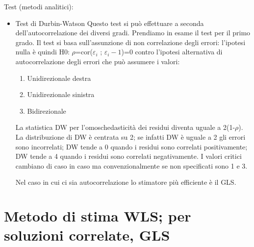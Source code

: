 \documentclass[a4page, 11pt]{article}
\begin{document}
Test (metodi analitici):
\begin{itemize}


\item Test di Durbin-Watson
Questo test si può effettuare a seconda dell’autocorrelazione dei diversi gradi. Prendiamo in esame il test per il primo grado.
Il test si basa sull’assunzione di non correlazione degli errori: l’ipotesi nulla è quindi H0: $\rho$=cor($\varepsilon_i$ ; $\varepsilon_i-1$)=0 contro l’ipotesi alternativa di autocorrelazione degli errori che può assumere i valori:
	\begin{enumerate}[noitemsep]
	\item Unidirezionale destra
	\item Unidirezionale sinistra
	\item Bidirezionale	
	\end{enumerate}
La statistica DW per l’omoschedasticità dei residui diventa uguale a 2(1-$\rho$). 
La distribuzione di DW è centrata su 2; se infatti DW è uguale a 2 gli errori sono incorrelati; DW tende a 0 quando i residui sono correlati positivamente; DW tende a 4 quando i residui sono correlati negativamente. I valori critici cambiano di caso in caso ma convenzionalmente se non specificati sono 1 e 3. 

Nel caso in cui ci sia autocorrelazione lo stimatore più efficiente è il GLS.

\end{itemize}

\section{Metodo di stima WLS; per soluzioni correlate, GLS }
\end{document}
